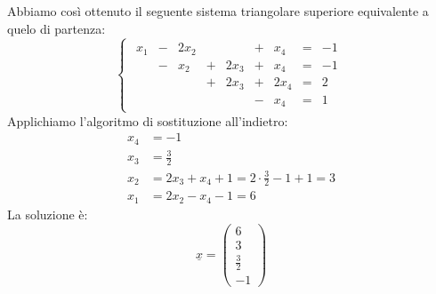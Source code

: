 \documentclass[12pt]{report}
\newcounter{exercise}
\begin{document}
\begin{exercise}{}{}
Abbiamo così ottenuto il seguente sistema triangolare superiore equivalente a quelo di partenza:
\[
\begin{cases}
\begin{array}{rcrcrcrcr}
  x_1 & - & 2x_2 &   &      & + &  x_4 & = & -1 \\
  & - &  x_2 & + & 2x_3 & +  & x_4     & = & -1 \\
  &  &  &  + &  2x_3    & + & 2x_4 & = &  2 \\
  &  &  &   &      & - & x_4 & = &  1
\end{array}
\end{cases}
\]
Applichiamo l'algoritmo di sostituzione all'indietro:
\begin{align*}
	x_4 &= -1 \\
	x_3 &= \frac{3}{2} \\
	x_2 &= 2x_3 + x_4 + 1 = 2\cdot \frac{3}{2} -1 + 1 = 3 \\
	x_1 &= 2x_2 - x_4 -1 = 6
\end{align*}
La soluzione è:
\[
\underline{x} = \begin{pmatrix}
	6 \\
	3 \\
	\frac{3}{2} \\
	-1
\end{pmatrix}
\]
\end{exercise}
\end{document}
